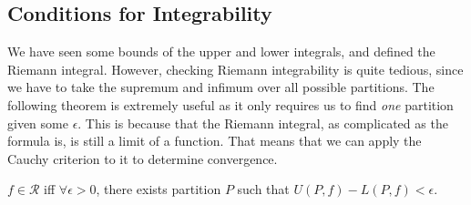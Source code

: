 \subsection{Conditions for Integrability}

  We have seen some bounds of the upper and lower integrals, and defined the Riemann integral. However, checking Riemann integrability is quite tedious, since we have to take the supremum and infimum over all possible partitions. The following theorem is extremely useful as it only requires us to find \textit{one} partition given some $\epsilon$. This is because that the Riemann integral, as complicated as the formula is, is still a limit of a function. That means that we can apply the Cauchy criterion to it to determine convergence. 

  \begin{theorem}
    $f \in \mathcal{R}$ iff $\forall \epsilon > 0$, there exists partition $P$ such that $U(P, f) - L(P, f) < \epsilon$. 
  \end{theorem}
